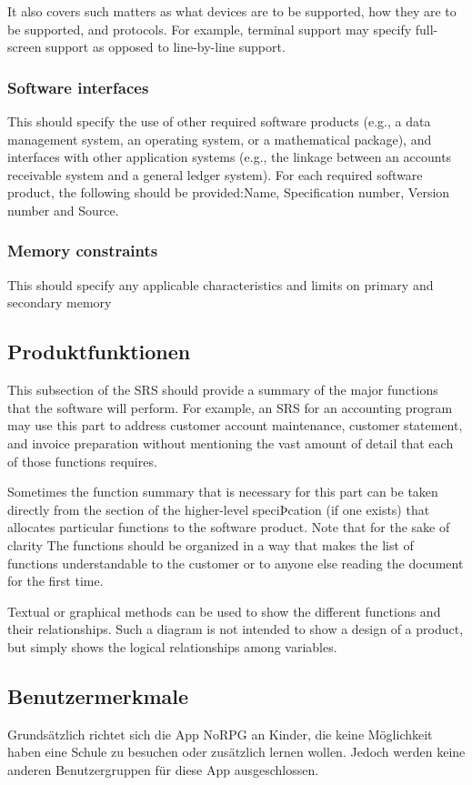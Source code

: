 			It also covers such matters as what devices are to be supported, how they are to be supported, and protocols. For example, terminal support may specify full-screen support as opposed to line-by-line support.
		
		\subsubsection{Software interfaces}
			This should specify the use of other required software products (e.g., a data management system, an operating system, or a mathematical package), and interfaces with other application systems (e.g., the linkage between an accounts receivable system and a general ledger system). For each required software product, the following should be provided:Name, Specification number, Version number and Source.
		
		\subsubsection{Memory constraints}
			This should specify any applicable characteristics and limits on primary and secondary memory
		
	\subsection{Produktfunktionen}
		This subsection of the SRS should provide a summary of the major functions that the software will perform. For example, an SRS for an accounting program may use this part to address customer account maintenance, customer statement, and invoice preparation without mentioning the vast amount of detail that each of those functions requires.
		
		Sometimes the function summary that is necessary for this part can be taken directly from the section of the higher-level speciÞcation (if one exists) that allocates particular functions to the software product. Note that for the sake of clarity The functions should be organized in a way that makes the list of functions understandable to the customer or to anyone else reading the document for the first time.
		
		Textual or graphical methods can be used to show the different functions and their relationships. Such a diagram is not intended to show a design of a product, but simply shows the logical relationships among variables.
	
	\subsection{Benutzermerkmale}
		Grundsätzlich richtet sich die App NoRPG an Kinder, die keine Möglichkeit haben eine Schule zu besuchen oder zusätzlich lernen wollen. Jedoch werden keine anderen Benutzergruppen für diese App ausgeschlossen.
		
